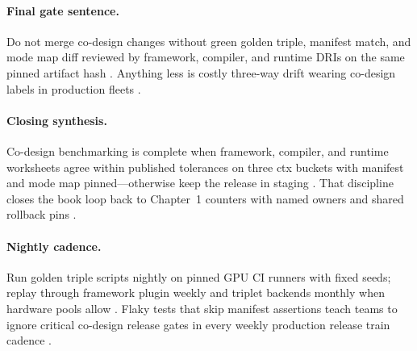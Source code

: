 \paragraph{Final gate sentence.} Do not merge co-design changes without green golden triple, manifest match, and mode map diff reviewed by framework, compiler, and runtime DRIs on the same pinned artifact hash \citep{yirage2026,chen2020compilerbasedhardw,patel2025llminference,kwon2023vllm,taxbreak2026,memoryfloor2026,liu2024deepseekv3,nvidia2024cudagraphs,dao2022flashattention,amd2024aie,amd2024xdna,dlbook,dao2023flashdecoding,nvidia2022hopper,semianalysis2024tma}. Anything less is costly three-way drift wearing co-design labels in production fleets \citep{memoryfloor2026,taxbreak2026,patel2025llminference,yirage2026,chen2020compilerbasedhardw,kwon2023vllm,dlbook}.

\paragraph{Closing synthesis.} Co-design benchmarking is complete when framework, compiler, and runtime worksheets agree within published tolerances on three ctx buckets with manifest and mode map pinned---otherwise keep the release in staging \citep{yirage2026,chen2020compilerbasedhardw,patel2025llminference,kwon2023vllm,taxbreak2026,memoryfloor2026,liu2024deepseekv3,nvidia2024cudagraphs,dao2022flashattention,amd2024xdna,amd2024aie,dlbook,dao2023flashdecoding,nvidia2022hopper,semianalysis2024tma}. That discipline closes the book loop back to Chapter~1 counters with named owners and shared rollback pins \citep{patel2025llminference,taxbreak2026,memoryfloor2026,yirage2026,chen2020compilerbasedhardw,dlbook}.



\paragraph{Nightly cadence.} Run golden triple scripts nightly on pinned GPU CI runners with fixed seeds; replay through framework plugin weekly and triplet backends monthly when hardware pools allow \citep{yirage2026,chen2020compilerbasedhardw,patel2025llminference,kwon2023vllm,taxbreak2026,memoryfloor2026,liu2024deepseekv3,nvidia2024cudagraphs,dao2022flashattention,amd2024aie,amd2024xdna,dlbook,dao2023flashdecoding,nvidia2022hopper,semianalysis2024tma}. Flaky tests that skip manifest assertions teach teams to ignore critical co-design release gates in every weekly production release train cadence \citep{patel2025llminference,yirage2026,chen2020compilerbasedhardw,kwon2023vllm,memoryfloor2026,taxbreak2026,dlbook}.


